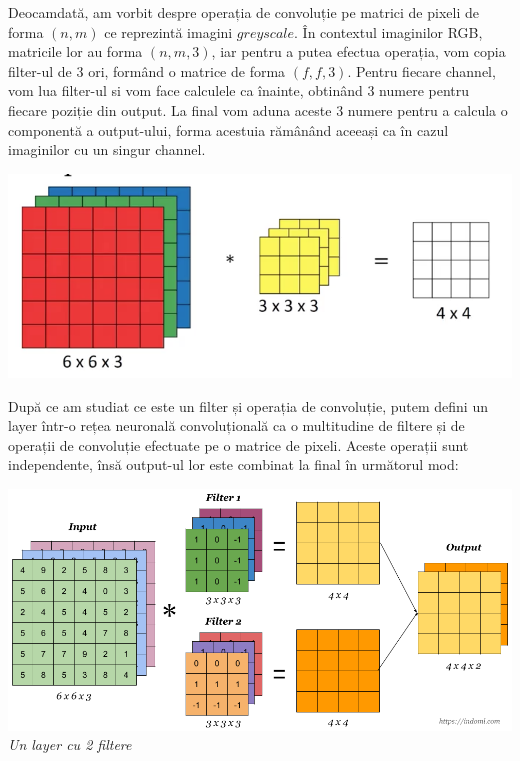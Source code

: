 Deocamdată, am vorbit despre operația de convoluție pe matrici de pixeli de forma $(n,m)$ ce reprezintă imagini $greyscale$. În contextul imaginilor RGB, matricile lor au forma $(n,m,3)$, iar pentru a putea efectua operația, vom copia filter-ul de 3 ori, formând o matrice de forma $(f,f,3)$. Pentru fiecare channel, vom lua filter-ul si vom face calculele ca înainte, obtinând 3 numere pentru fiecare poziție din output. La final vom aduna aceste 3 numere pentru a calcula o componentă a output-ului, forma acestuia rămânând aceeași ca în cazul imaginilor cu un singur channel.

\begin{center}
\includegraphics[scale=0.4]{convVolumes} \\
\end{center}

După ce am studiat ce este un filter și operația de convoluție, putem defini un layer într-o rețea neuronală convoluțională ca o multitudine de filtere și de operații de convoluție efectuate pe o matrice de pixeli. Aceste operații sunt independente, însă output-ul lor este combinat la final în următorul mod:

\begin{center}
\includegraphics[scale=0.4]{convLayer} \\
\textit{Un layer cu 2 filtere}
\end{center}

